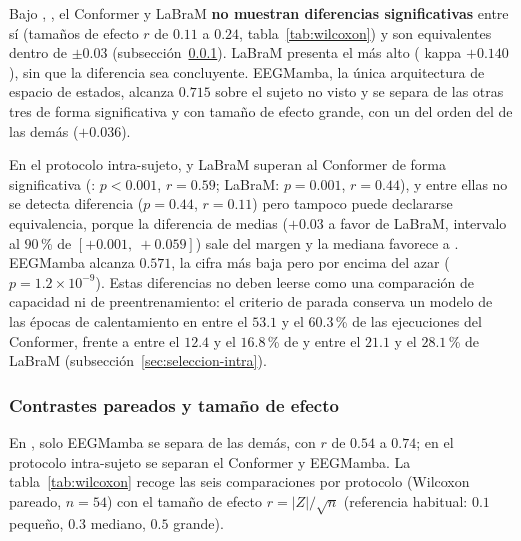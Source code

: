 Bajo \loso{}, \eegnet{}, el Conformer y LaBraM \textbf{no muestran diferencias
significativas} entre sí (tamaños de efecto $r$ de $0.11$ a $0.24$, tabla~\ref{tab:wilcoxon}) y son
equivalentes dentro de $\pm 0.03$ (subsección~\ref{sec:wilcoxon}). LaBraM presenta el \dsi{} más alto
(\dsi{} kappa $+0.140$), sin que la diferencia sea concluyente. EEGMamba, la única arquitectura de espacio
de estados, alcanza $0.715$ sobre el sujeto no visto y se separa de las otras tres de forma significativa
y con tamaño de efecto grande, con un \dsi{} del orden del de las demás ($+0.036$).

En el protocolo intra-sujeto, \eegnet{} y LaBraM superan al Conformer de forma significativa
(\eegnet{}: $p < 0.001$, $r = 0.59$; LaBraM: $p = 0.001$, $r = 0.44$), y entre ellas no se detecta
diferencia ($p = 0.44$, $r = 0.11$) pero tampoco puede declararse equivalencia, porque la diferencia de
medias ($+0.03$ a favor de LaBraM, intervalo al $90$\,\% de $[+0.001,\ +0.059]$) sale del margen y la mediana
favorece a \eegnet{}. EEGMamba alcanza $0.571$, la cifra más baja pero por encima del azar
($p = 1.2\times10^{-9}$). Estas diferencias no deben leerse como una comparación de capacidad ni de
preentrenamiento: el criterio de parada conserva un modelo de las épocas de calentamiento en entre el
$53.1$ y el $60.3$\,\% de las ejecuciones del Conformer, frente a entre el $12.4$ y el $16.8$\,\% de
\eegnet{} y entre el $21.1$ y el $28.1$\,\% de LaBraM (subsección~\ref{sec:seleccion-intra}).

\subsubsection{Contrastes pareados y tamaño de efecto}
\label{sec:wilcoxon}

En \loso{}, solo EEGMamba se separa de las demás, con $r$ de $0.54$ a $0.74$; en el protocolo
intra-sujeto se separan el Conformer y EEGMamba. La tabla~\ref{tab:wilcoxon} recoge las seis
comparaciones por protocolo (Wilcoxon pareado, $n = 54$) con el tamaño de efecto
$r = |Z|/\sqrt{n}$ (referencia habitual: $0.1$ pequeño, $0.3$ mediano, $0.5$ grande).

